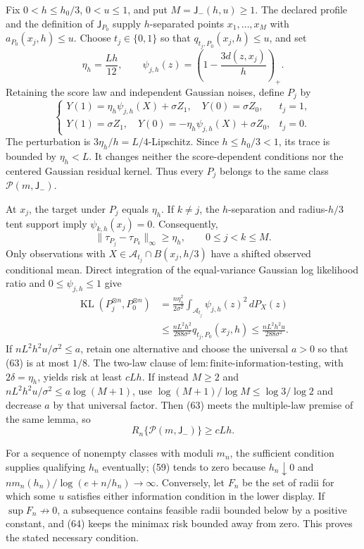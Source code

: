 Fix \(0<h\le h_0/3\), \(0<u\le1\), and put
\(M=\mathsf J_{-}(h,u)\ge1\).  The declared profile and the definition of
\(\mathsf J_{P_0}\) supply \(h\)-separated points
\(x_1,\ldots,x_M\) with \(a_{P_0}(x_j,h)\le u\).  Choose
\(t_j\in\{0,1\}\) so that \(q_{t_j,P_0}(x_j,h)\le u\), and set
\[
 \eta_h=\frac{Lh}{12},
 \qquad
 \psi_{j,h}(z)=\left(1-\frac{3d(z,x_j)}h\right)_+.
 \tag{60}
\]
Retaining the score law and independent Gaussian noises, define \(P_j\)
by
\[
 \begin{cases}
 Y(1)=\eta_h\psi_{j,h}(X)+\sigma Z_1,
 \quad Y(0)=\sigma Z_0,&t_j=1,\\
 Y(1)=\sigma Z_1,
 \quad Y(0)=-\eta_h\psi_{j,h}(X)+\sigma Z_0,&t_j=0.
 \end{cases}
 \tag{61}
\]
The perturbation is \(3\eta_h/h=L/4\)-Lipschitz.  Since
\(h\le h_0/3<1\), its trace is bounded by \(\eta_h<L\).  It changes
neither the score-dependent conditions nor the centered Gaussian
residual kernel.  Thus every \(P_j\) belongs to the same class
\(\mathcal P(m,\mathsf J_{-})\).

At \(x_j\), the target under \(P_j\) equals \(\eta_h\).  If \(k\ne j\),
the \(h\)-separation and radius-\(h/3\) tent support imply
\(\psi_{k,h}(x_j)=0\).  Consequently,
\[
 \|\tau_{P_j}-\tau_{P_k}\|_\infty\ge\eta_h,
 \qquad 0\le j<k\le M.
 \tag{62}
\]
Only observations with
\(X\in\mathcal A_{t_j}\cap B(x_j,h/3)\) have a shifted observed
conditional mean.  Direct integration of the equal-variance Gaussian
log likelihood ratio and \(0\le\psi_{j,h}\le1\) give
\[
 \begin{aligned}
 \operatorname{KL}(P_j^{\otimes n},P_0^{\otimes n})
 &=\frac{n\eta_h^2}{2\sigma^2}
   \int_{\mathcal A_{t_j}}\psi_{j,h}(z)^2\,dP_X(z)\\
 &\le\frac{nL^2h^2}{288\sigma^2}q_{t_j,P_0}(x_j,h)
 \le\frac{nL^2h^2u}{288\sigma^2}.
 \end{aligned}
 \tag{63}
\]
If \(nL^2h^2u/\sigma^2\le a\), retain one alternative and choose the
universal \(a>0\) so that (63) is at most \(1/8\).  The two-law clause of
\(\mathrm{lem:finite\text{-}information\text{-}testing}\), with
\(2\delta=\eta_h\), yields risk at least \(cLh\).  If instead \(M\ge2\)
and \(nL^2h^2u/\sigma^2\le a\log(M+1)\), use
\(\log(M+1)/\log M\le\log3/\log2\) and decrease \(a\) by that universal
factor.  Then (63) meets the multiple-law premise of the same lemma, so
\[
 R_n\{\mathcal P(m,\mathsf J_{-})\}\ge cLh.
 \tag{64}
\]

For a sequence of nonempty classes with moduli \(m_n\), the sufficient
condition supplies qualifying \(h_n\) eventually; (59) tends to zero
because \(h_n\downarrow0\) and
\(nm_n(h_n)/\log(e+n/h_n)\to\infty\).  Conversely, let \(F_n\) be the
set of radii for which some \(u\) satisfies either information condition
in the lower display.  If \(\sup F_n\not\to0\), a subsequence contains
feasible radii bounded below by a positive constant, and (64) keeps the
minimax risk bounded away from zero.  This proves the stated necessary
condition.


